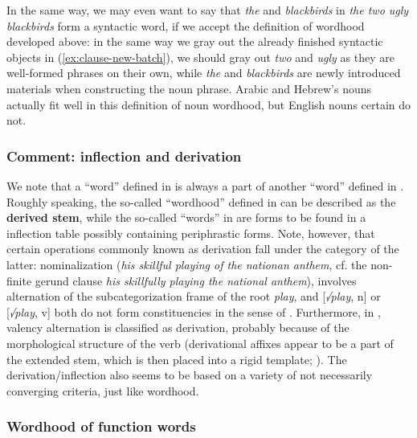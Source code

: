 \documentclass[a4paper, oneside, scheme=plain, 12pt]{article}
\newcommand*{\concept}[1]{\textbf{#1}}
\newcommand{\form}[1]{\emph{#1}}
\begin{document}
In the same way, we may even want to say that \form{the} and \form{blackbirds} 
in \form{the two ugly blackbirds} form a syntactic word,
if we accept the definition of wordhood developed above:
in the same way we gray out the already finished syntactic objects in (\ref{ex:clause-new-batch}),
we should gray out \form{two} and \form{ugly} as they are well-formed phrases on their own,
while \form{the} and \form{blackbirds} are newly introduced materials
when constructing the noun phrase.
Arabic and Hebrew's nouns actually fit well in this definition of noun wordhood,
but English nouns certain do not.

\subsubsection{Comment: inflection and derivation}\label{sec:inflection-derivation}

We note that a ``word'' defined in 
is always a part of another ``word'' defined in .
Roughly speaking, the so-called ``wordhood'' defined in 
can be described as the \concept{derived stem},
while the so-called ``words'' in 
are forms to be found in a inflection table possibly containing periphrastic forms.
Note, however, that certain operations commonly known as derivation
fall under the category of the latter:
nominalization (\form{his skillful playing of the nationan anthem},
cf. the non-finite gerund clause \form{his skillfully playing the national anthem}),
involves alternation of the subcategorization frame of the root \form{play},
and [\form{√play}, n] or [\form{√play}, v] both do not form constituencies
in the sense of .
Furthermore, in \citet{jacques2021grammar}, valency alternation is classified as derivation,
probably because of the morphological structure of the verb
(derivational affixes appear to be a part of the extended stem,
which is then placed into a rigid template; ).
The derivation/inflection also seems to be based on a variety of 
not necessarily converging criteria, just like wordhood.

\subsubsection{Wordhood of function words}\label{sec:no-function-word-in-syntax}
\end{document}
